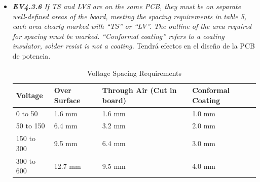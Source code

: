 \begin{itemize}
    \item \textit{\textbf{EV4.3.6} If TS and LVS are on the same PCB, they must be on separate well-defined areas of the board, meeting the spacing requirements in table 5, each area clearly marked with “TS” or “LV”. The outline of the area required for spacing must  be marked. “Conformal coating” refers to a coating insulator, solder resist is not a coating.} Tendrá efectos en el diseño de la PCB de potencia.
    
	\begin{table}[H]
		\centering
		\caption{Voltage Spacing Requirements}
		\begin{tabular}{|l|l|l|l|}
			\hline
			Voltage & Over Surface & Through Air (Cut in board) & Conformal Coating \\
			\hline
			0 to 50 & 1.6 mm & 1.6 mm & 1.0 mm \\
			\hline
			50 to 150 & 6.4 mm & 3.2 mm & 2.0 mm \\
			\hline
			150 to 300 & 9.5 mm & 6.4 mm & 3.0 mm \\
			\hline
			300 to 600 & 12.7 mm & 9.5 mm & 4.0 mm \\
			\hline
		\end{tabular}
	\end{table}



\end{itemize}
